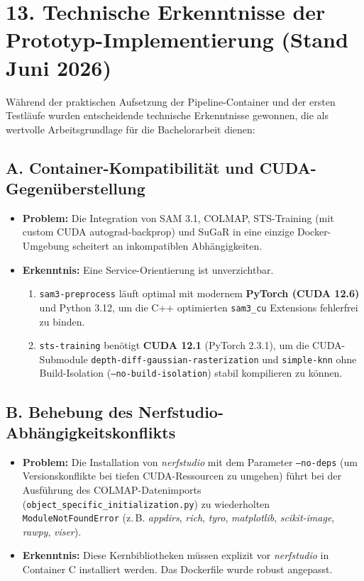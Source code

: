 \documentclass[11pt, a4paper]{article}
\begin{document}
\section{13. Technische Erkenntnisse der Prototyp-Implementierung (Stand Juni 2026)}

W\"ahrend der praktischen Aufsetzung der Pipeline-Container und der ersten Testl\"aufe wurden entscheidende technische Erkenntnisse gewonnen, die als wertvolle Arbeitsgrundlage f\"ur die Bachelorarbeit dienen:

\subsection{A. Container-Kompatibilit\"at und CUDA-Gegen\"uberstellung}
\begin{itemize}
    \item \textbf{Problem:} Die Integration von SAM 3.1, COLMAP, STS-Training (mit custom CUDA autograd-backprop) und SuGaR in eine einzige Docker-Umgebung scheitert an inkompatiblen Abh\"angigkeiten.
    \item \textbf{Erkenntnis:} Eine Service-Orientierung ist unverzichtbar.
    \begin{enumerate}
        \item \texttt{sam3-preprocess} l\"auft optimal mit modernem \textbf{PyTorch (CUDA 12.6)} und Python 3.12, um die C++ optimierten \texttt{sam3\_cu} Extensions fehlerfrei zu binden.
        \item \texttt{sts-training} ben\"otigt \textbf{CUDA 12.1} (PyTorch 2.3.1), um die CUDA-Submodule \texttt{depth-diff-gaussian-rasterization} und \texttt{simple-knn} ohne Build-Isolation (\texttt{--no-build-isolation}) stabil kompilieren zu k\"onnen.
    \end{enumerate}
\end{itemize}

\subsection{B. Behebung des Nerfstudio-Abh\"angigkeitskonflikts}
\begin{itemize}
    \item \textbf{Problem:} Die Installation von \textit{nerfstudio} mit dem Parameter \texttt{--no-deps} (um Versionskonflikte bei tiefen CUDA-Ressourcen zu umgehen) f\"uhrt bei der Ausführung des COLMAP-Datenimports (\texttt{object\_specific\_initialization.py}) zu wiederholten \texttt{ModuleNotFoundError} (z.\,B. \textit{appdirs}, \textit{rich}, \textit{tyro}, \textit{matplotlib}, \textit{scikit-image}, \textit{rawpy}, \textit{viser}).
    \item \textbf{Erkenntnis:} Diese Kernbibliotheken m\"ussen explizit vor \textit{nerfstudio} in Container C installiert werden. Das Dockerfile wurde robust angepasst.
\end{itemize}
\end{document}

